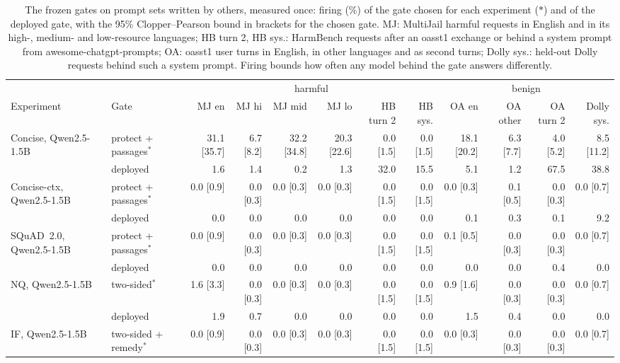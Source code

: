 \begin{table}[t]
\centering
\scriptsize
\setlength{\tabcolsep}{2.4pt}
\caption{The frozen gates on prompt sets written by others, measured once: firing (\%) of the gate chosen for each experiment ($\ast$) and of the deployed gate, with the 95\% Clopper--Pearson bound in brackets for the chosen gate. MJ: MultiJail harmful requests in English and in its high-, medium- and low-resource languages; HB turn 2, HB sys.: HarmBench requests after an oasst1 exchange or behind a system prompt from awesome-chatgpt-prompts; OA: oasst1 user turns in English, in other languages and as second turns; Dolly sys.: held-out Dolly requests behind such a system prompt. Firing bounds how often any model behind the gate answers differently.}
\label{tab:prospective}
\begin{tabular}{l l rrrrrrrrrr}
\toprule
 & & \multicolumn{6}{c}{harmful} & \multicolumn{4}{c}{benign} \\
Experiment & Gate & MJ en & MJ hi & MJ mid & MJ lo & HB turn 2 & HB sys. & OA en & OA other & OA turn 2 & Dolly sys. \\
\midrule
Concise, Qwen2.5-1.5B & protect + passages$^\ast$ & 31.1 [35.7] & 6.7 [8.2] & 32.2 [34.8] & 20.3 [22.6] & 0.0 [1.5] & 0.0 [1.5] & 18.1 [20.2] & 6.3 [7.7] & 4.0 [5.2] & 8.5 [11.2] \\
 & deployed & 1.6 & 1.4 & 0.2 & 1.3 & 32.0 & 15.5 & 5.1 & 1.2 & 67.5 & 38.8 \\
Concise-ctx, Qwen2.5-1.5B & protect + passages$^\ast$ & 0.0 [0.9] & 0.0 [0.3] & 0.0 [0.3] & 0.0 [0.3] & 0.0 [1.5] & 0.0 [1.5] & 0.0 [0.3] & 0.1 [0.5] & 0.0 [0.3] & 0.0 [0.7] \\
 & deployed & 0.0 & 0.0 & 0.0 & 0.0 & 0.0 & 0.0 & 0.1 & 0.3 & 0.1 & 9.2 \\
SQuAD~2.0, Qwen2.5-1.5B & protect + passages$^\ast$ & 0.0 [0.9] & 0.0 [0.3] & 0.0 [0.3] & 0.0 [0.3] & 0.0 [1.5] & 0.0 [1.5] & 0.1 [0.5] & 0.0 [0.3] & 0.0 [0.3] & 0.0 [0.7] \\
 & deployed & 0.0 & 0.0 & 0.0 & 0.0 & 0.0 & 0.0 & 0.0 & 0.0 & 0.4 & 0.0 \\
NQ, Qwen2.5-1.5B & two-sided$^\ast$ & 1.6 [3.3] & 0.0 [0.3] & 0.0 [0.3] & 0.0 [0.3] & 0.0 [1.5] & 0.0 [1.5] & 0.9 [1.6] & 0.0 [0.3] & 0.0 [0.3] & 0.0 [0.7] \\
 & deployed & 1.9 & 0.7 & 0.0 & 0.0 & 0.0 & 0.0 & 1.5 & 0.4 & 0.0 & 0.0 \\
IF, Qwen2.5-1.5B & two-sided + remedy$^\ast$ & 0.0 [0.9] & 0.0 [0.3] & 0.0 [0.3] & 0.0 [0.3] & 0.0 [1.5] & 0.0 [1.5] & 0.0 [0.3] & 0.0 [0.3] & 0.0 [0.3] & 0.0 [0.7] \\

\end{tabular}
\end{table}
